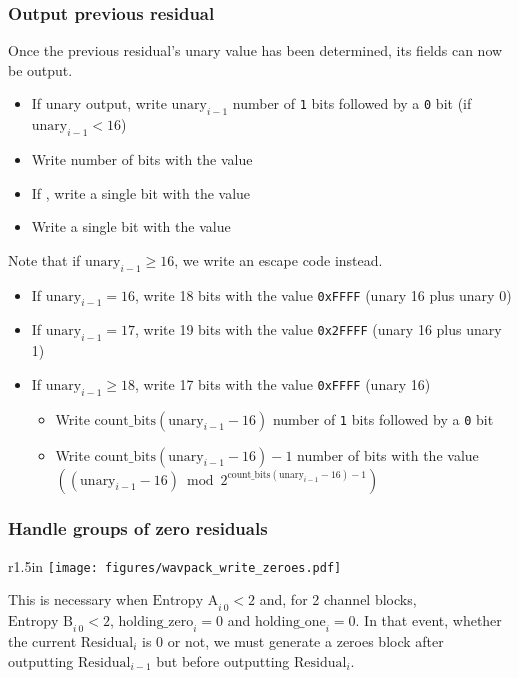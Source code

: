 \subsubsection{Output previous residual}

Once the previous residual's unary value has been determined,
its fields can now be output.
\begin{itemize}
\item If unary output, write $\text{unary}_{i - 1}$ number of \texttt{1} bits followed by a \texttt{0} bit (if $\text{unary}_{i - 1} < 16$)
\item Write  number of bits with the value 
\item If , write a single bit with the value 
\item Write a single bit with the value 
\end{itemize}
Note that if $\text{unary}_{i - 1} \geq 16$, we write an escape code instead.
\begin{itemize}
\item If $\text{unary}_{i - 1} = 16$, write 18 bits with the value \texttt{0xFFFF} (unary 16 plus unary 0)
\item If $\text{unary}_{i - 1} = 17$, write 19 bits with the value \texttt{0x2FFFF} (unary 16 plus unary 1)
\item If $\text{unary}_{i - 1} \geq 18$, write 17 bits with the value \texttt{0xFFFF} (unary 16)
\begin{itemize}
\item Write $\text{count\_bits}(\text{unary}_{i - 1} - 16)$ number of
\texttt{1} bits followed by a \texttt{0} bit
\item Write $\text{count\_bits}(\text{unary}_{i - 1} - 16) - 1$ number of bits
with the value
\linebreak
$((\text{unary}_{i - 1} - 16) \bmod{2 ^ {\text{count\_bits}(\text{unary}_{i - 1} - 16) - 1}})$
\end{itemize}
\end{itemize}

\subsubsection{Handle groups of zero residuals}
\label{wavpack_zero_residuals}
\begin{wrapfigure}[20]{r}{1.5in}
\texttt{[image: figures/wavpack\_write\_zeroes.pdf]}
\end{wrapfigure}
This is necessary when $\text{Entropy A}_{i~0} < 2$ and,
for 2 channel blocks, $\text{Entropy B}_{i~0} < 2$,
$\text{holding\_zero}_i = 0$ and $\text{holding\_one}_i = 0$.
In that event, whether the current $\text{Residual}_i$ is 0 or not,
we must generate a zeroes block after outputting $\text{Residual}_{i - 1}$
but before outputting $\text{Residual}_i$.

